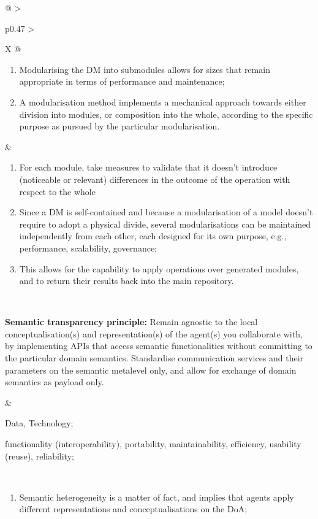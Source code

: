 \begin{xltabular}[l]{\linewidth}{@{} >{\small\raggedright\arraybackslash}p{0.47\linewidth} >{\small\raggedright\arraybackslash}X @{}}
\begin{enumerate}[left=6pt, nosep]
  \item Modularising the DM into submodules allows for sizes that remain appropriate in terms of performance and maintenance;
  \item A modularisation method implements a mechanical approach towards either division into modules, or composition into the whole, according to the specific purpose as pursued by the particular modularisation.
\end{enumerate}
&
\begin{enumerate}[left=10pt, nosep]
  \item For each module, take measures to validate that it doesn't introduce (noticeable or relevant) differences in the outcome of the operation with respect to the whole
  \item Since a DM is self-contained and because a modularisation of a model doesn't require to adopt a physical divide, several modularisations can be maintained independently from each other, each designed for its own purpose, e.g., performance, scalability, governance;
  \item This allows for the capability to apply operations over generated modules, and to return their results back into the main repository.
\end{enumerate} \\
%
%
%
\begin{mmdp}\label{dp:stp}{\bfseries Semantic transparency principle:}
\quad Remain agnostic to the local conceptualisation(s) and representation(s) of the agent(s) you collaborate with, by implementing APIs that access semantic functionalities without committing to the particular domain semantics. Standardise communication services and their parameters on the semantic metalevel only, and allow for exchange of domain semantics as payload only.\end{mmdp}
&
\begin{description}[labelwidth=3.7cm,leftmargin=3.7cm+1ex,nosep,topsep=2ex,labelsep=1ex,font=\bfseries]
\item[Type of information:] Data, Technology;
\item[Quality attributes:] functionality (interoperability), portability, maintainability, efficiency, usability (reuse), reliability;
\end{description}
\\
\begin{enumerate}[left=6pt, nosep]
  \item Semantic heterogeneity is a matter of fact, and implies that agents apply different representations and conceptualisations on the DoA;

\end{enumerate}
\end{xltabular}
